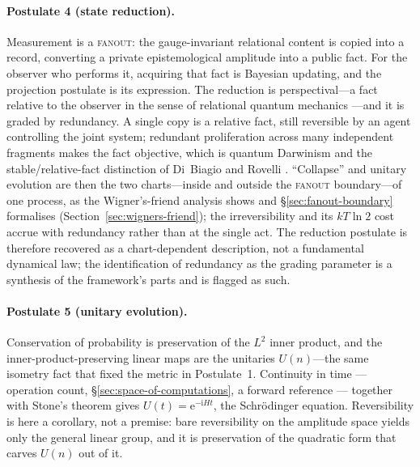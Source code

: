 \paragraph{Postulate 4 (state reduction).}
Measurement is a \textsc{fanout}: the gauge-invariant relational content is copied
into a record, converting a private epistemological amplitude into a public
fact. For the observer who performs it, acquiring that fact is Bayesian updating,
and the projection postulate is its expression. The reduction is perspectival---a
fact relative to the observer in the sense of relational quantum mechanics
\autocite{Rovelli1996a}---and it is graded by redundancy. A single copy is a
relative fact, still reversible by an agent controlling the joint system; redundant
proliferation across many independent fragments makes the fact objective, which is
quantum Darwinism \autocite{zurek_2009} and the stable/relative-fact distinction of
Di~Biagio and Rovelli \autocite{DiBiagioRovelli2021}. ``Collapse'' and unitary
evolution are then the two charts---inside and outside the \textsc{fanout}
boundary---of one process, as the Wigner's-friend analysis shows and \S\ref{sec:fanout-boundary} formalises
(Section~\ref{sec:wigners-friend}); the irreversibility and its $kT\ln 2$ cost
\autocite{Landauer_1961, wigner_1961} accrue with redundancy rather than at the
single act. The reduction postulate is therefore recovered as a chart-dependent
description, not a fundamental dynamical law; the identification of redundancy as
the grading parameter is a synthesis of the framework's parts and is flagged as
such.

\paragraph{Postulate 5 (unitary evolution).}
Conservation of probability is preservation of the $L^{2}$ inner product, and the
inner-product-preserving linear maps are the unitaries $U(n)$---the same
isometry fact that fixed the metric in Postulate~1. Continuity in time --- operation count,
\S\ref{sec:space-of-computations}, a forward reference --- together with Stone's theorem
\autocite{stone1932one} gives $U(t)=\mathrm{e}^{-\mathrm{i}Ht}$, the Schr\"odinger
equation. Reversibility is here a corollary, not a premise: bare reversibility on
the amplitude space yields only the general linear group, and it is preservation
of the quadratic form that carves $U(n)$ out of it.

